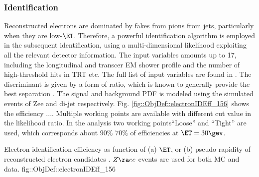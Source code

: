 


\subsubsection{Identification} \label{sec::objDef::electrons::id}
Reconstructed electrons are dominated by fakes from pions from jets, particularly when they are low-$\ET$. Therefore, a powerful identification algorithm is employed in the subsequent identification, using a multi-dimensional likelihood exploiting all the relevant detector information. The input variables amounts up to 17, including the longitudinal and transcer EM shower profile and the number of high-threshold hits in TRT etc. The full list of input variables are found in \cite{156_ElectronEffMeas_2015data}.
The discriminant is given by a form of ratio, which is known to generally provide the best separation \cite{NPLemma}.
The signal and background PDF is modeled using the simulated events of Zee and di-jet respectively.
Fig. \ref{fig::ObjDef::electronIDEff_156} shows the efficiency ....
Multiple working points are available with different cut value in the likelihood ratio. In the analysis two working points``Loose'' and ``Tight'' are used, which corresponds about $90\%$ $70\%$ of efficiencies at $\ET = 30\gev$.

{Electron identification efficiency as function of (a) $\ET$, or (b) pseudo-rapidity of reconstructed electron candidates \cite{156_ElectronEffMeas_2015data}. $Z\ra ee$ events are used for both MC and data.}
{fig::ObjDef::electronIDEff_156}






